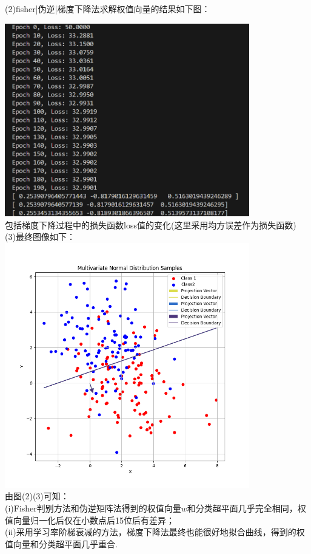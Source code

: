 \documentclass{article}
\begin{document}
(2)fisher|伪逆|梯度下降法求解权值向量的结果如下图：

\includegraphics[width=0.8\textwidth]{梯度下降过程及最终向量.png}\\
包括梯度下降过程中的损失函数loss值的变化(这里采用均方误差作为损失函数)\\
(3)最终图像如下：\\
\includegraphics[width=0.8\textwidth]{T4.png}\\
由图(2)(3)可知：\\
(i)Fisher判别方法和伪逆矩阵法得到的权值向量$w$和分类超平面几乎完全相同，权值向量归一化后仅在小数点后15位后有差异；\\
(ii)采用学习率阶梯衰减的方法，梯度下降法最终也能很好地拟合曲线，得到的权值向量和分类超平面几乎重合.
\end{document}
